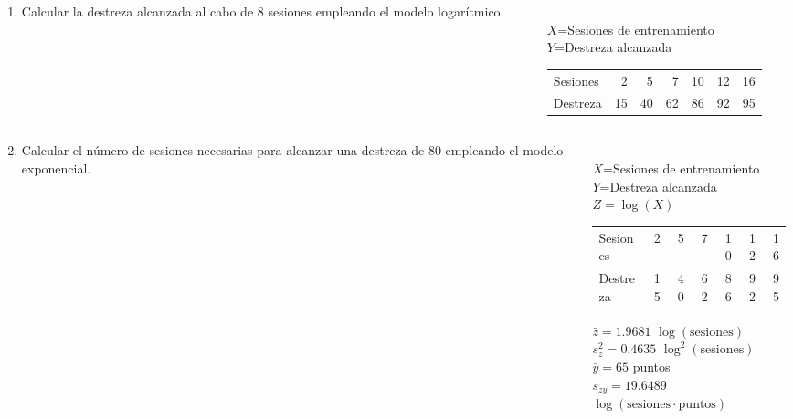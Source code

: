 \documentclass[aspectratio=149,10pt,xcolor=dvipsnames,t]{beamer}
\begin{document}
\begin{frame}
\begin{columns}
\begin{column}[T]{0.5\textwidth}
\begin{enumerate}
\item Calcular la destreza alcanzada al cabo de 8 sesiones empleando el modelo logarítmico. 
\end{enumerate}
\end{column}
\begin{column}[T]{0.5\textwidth}
\\
$X$=Sesiones de entrenamiento\\
$Y$=Destreza alcanzada\\[.5cm]
\begin{tabular}{lrrrrrr}
\hline
Sesiones & 2 & 5 & 7 & 10 & 12 & 16\\
Destreza & 15 & 40 & 62 & 86 & 92 & 95\\
\hline
\end{tabular}
\end{column}
\end{columns}
\end{frame}


\begin{frame}
\begin{columns}
\begin{column}[T]{0.5\textwidth}
\begin{enumerate}
\setcounter{enumi}{1}
\item Calcular el número de sesiones necesarias para alcanzar una destreza de 80 empleando el modelo exponencial.\end{enumerate}
\end{column}
\begin{column}[T]{0.5\textwidth}
\\
$X$=Sesiones de entrenamiento\\
$Y$=Destreza alcanzada\\
$Z=\log(X)$\\
\medskip
\begin{tabular}{lrrrrrr}
\hline
Sesiones & 2 & 5 & 7 & 10 & 12 & 16\\
Destreza & 15 & 40 & 62 & 86 & 92 & 95\\
\hline
\end{tabular} 

\medskip
$\bar z = 1.9681$ $\log(\text{sesiones})$\\
$s_z^2=0.4635$ $\log^2(\text{sesiones})$\\
$\bar y = 65$ puntos\\
$s_{zy} = 19.6489$ $\log(\text{sesiones}\cdot\text{puntos})$
\end{column}
\end{columns}
\end{frame}
\end{document}
